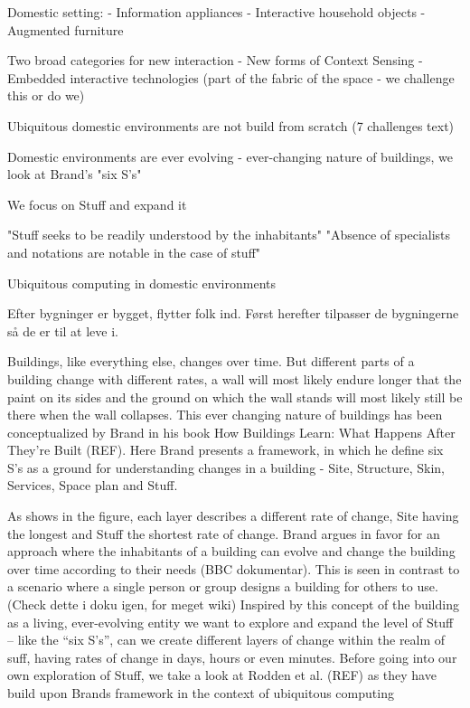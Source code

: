 Domestic setting:
 - Information appliances
 - Interactive household objects
 - Augmented furniture
 
Two broad categories for new interaction
 - New forms of Context Sensing
 - Embedded interactive technologies (part of the fabric of the space - we challenge this or do we)
 
Ubiquitous domestic environments are not build from scratch (7 challenges text)

Domestic environments are ever evolving - ever-changing nature of buildings, we look at Brand's "six S's"

We focus on Stuff and expand it

"Stuff seeks to be readily understood by the inhabitants"
"Absence of specialists and notations are notable in the case of stuff"


Ubiquitous computing in domestic environments

Efter bygninger er bygget, flytter folk ind. Først herefter tilpasser de bygningerne så de er til at leve i.

Buildings, like everything else, changes over time. But different parts of a building change with different rates, a wall will most likely endure longer that the paint on its sides and the ground on which the wall stands will most likely still be there when the wall collapses. This ever changing nature of buildings has been conceptualized by Brand in his book How Buildings Learn: What Happens After They’re Built (REF). Here Brand presents a framework, in which he define six S’s as a ground for understanding changes in a building - Site, Structure, Skin, Services, Space plan and Stuff. 
 
As shows in the figure, each layer describes a different rate of change, Site having the longest and Stuff the shortest rate of change.
Brand argues in favor for an approach where the inhabitants of a building can evolve and change the building over time according to their needs (BBC dokumentar). This is seen in contrast to a scenario where a single person or group designs a building for others to use. (Check dette i doku igen, for meget wiki)
Inspired by this concept of the building as a living, ever-evolving entity we want to explore and expand the level of Stuff – like the “six S’s”, can we create different layers of change within the realm of suff, having rates of change in days, hours or even minutes.
Before going into our own exploration of Stuff, we take a look at Rodden et al. (REF) as they have build upon Brands framework in the context of ubiquitous computing    
